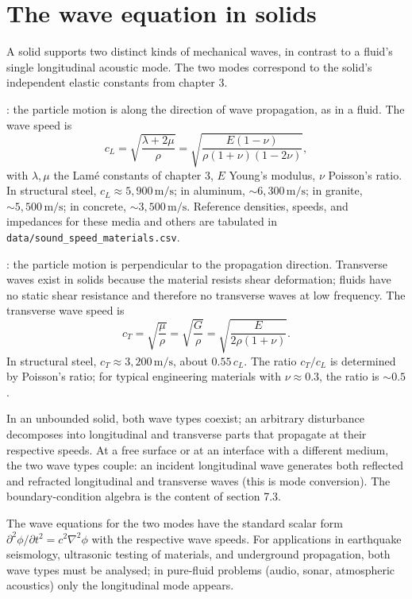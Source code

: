 \section{The wave equation in solids}

A solid supports two distinct kinds of mechanical waves, in contrast
to a fluid's single longitudinal acoustic mode. The two modes
correspond to the solid's independent elastic constants from
chapter 3.

: the particle motion is along the
direction of wave propagation, as in a fluid. The wave speed is
\[
c_L = \sqrt{\frac{\lambda + 2\mu}{\rho}} = \sqrt{\frac{E(1-\nu)}{
\rho(1+\nu)(1-2\nu)}},
\]
with $\lambda, \mu$ the Lam\'e constants of chapter 3, $E$ Young's
modulus, $\nu$ Poisson's ratio. In structural steel,
$c_L \approx 5{,}900\,\si{\meter\per\second}$; in aluminum,
$\sim 6{,}300\,\si{\meter\per\second}$; in granite, $\sim 5{,}500\,\si
{\meter\per\second}$; in concrete, $\sim 3{,}500\,\si{\meter\per\second}$.
Reference densities, speeds, and impedances for these media and others
are tabulated in \texttt{data/sound\_speed\_materials.csv}.

: the particle motion is perpendicular
to the propagation direction. Transverse waves exist in solids
because the material resists shear deformation; fluids have no
static shear resistance and therefore no transverse waves at low
frequency. The transverse wave speed is
\[
c_T = \sqrt{\frac{\mu}{\rho}} = \sqrt{\frac{G}{\rho}} = \sqrt{
\frac{E}{2\rho(1+\nu)}}.
\]
In structural steel, $c_T \approx 3{,}200\,\si{\meter\per\second}$,
about $0.55\,c_L$. The ratio $c_T/c_L$ is determined by Poisson's
ratio; for typical engineering materials with $\nu \approx 0.3$, the
ratio is $\sim 0.5$.

In an unbounded solid, both wave types coexist; an arbitrary
disturbance decomposes into longitudinal and transverse parts that
propagate at their respective speeds. At a free surface or at an
interface with a different medium, the two wave types couple: an
incident longitudinal wave generates both reflected and refracted
longitudinal and transverse waves (this is mode conversion). The
boundary-condition algebra is the content of section 7.3.

The wave equations for the two modes have the standard scalar form
$\partial^2 \phi/\partial t^2 = c^2 \nabla^2 \phi$ with the
respective wave speeds. For applications in earthquake seismology,
ultrasonic testing of materials, and underground propagation, both
wave types must be analysed; in pure-fluid problems (audio, sonar,
atmospheric acoustics) only the longitudinal mode appears.

